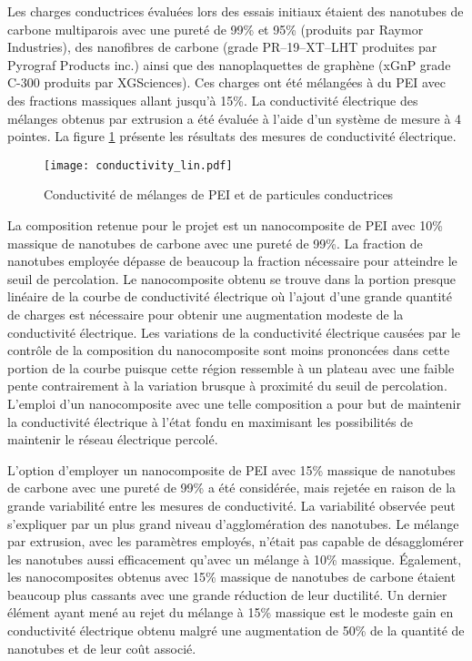 Les charges conductrices évaluées lors des essais initiaux étaient des nanotubes de carbone multiparois avec une pureté de 99\% et 95\% (produits par Raymor Industries), des nanofibres de carbone (grade PR--19--XT--LHT produites par Pyrograf Products inc.) ainsi que des nanoplaquettes de graphène (xGnP grade C-300 produits par XGSciences). 
Ces charges ont été mélangées à du PEI avec des fractions massiques allant jusqu'à 15\%.
La conductivité électrique des mélanges obtenus par extrusion a été évaluée à l'aide d'un système de mesure à 4 pointes. 
La figure \ref{fig:conductivite_lin} présente les résultats des mesures de conductivité électrique. 

\begin{figure}[h]
	\centering
	\texttt{[image: conductivity\_lin.pdf]}
	\caption{Conductivité de mélanges de PEI et de particules conductrices}
	\label{fig:conductivite_lin}
\end{figure}

La composition retenue pour le projet est un nanocomposite de PEI avec 10\% massique de nanotubes de carbone avec une pureté de 99\%. 
La fraction de nanotubes employée dépasse de beaucoup la fraction nécessaire pour atteindre le seuil de percolation.
Le nanocomposite obtenu se trouve dans la portion presque linéaire de la courbe de conductivité électrique où l'ajout d'une grande quantité de charges est nécessaire pour obtenir une augmentation modeste de la conductivité électrique. 
Les variations de la conductivité électrique causées par le contrôle de la composition du nanocomposite sont moins prononcées dans cette portion de la courbe puisque cette région ressemble à un plateau avec une faible pente contrairement à la variation brusque à proximité du seuil de percolation. 
L'emploi d'un nanocomposite avec une telle composition a pour but de maintenir la conductivité électrique à l'état fondu en maximisant les possibilités de maintenir le réseau électrique percolé. 

L'option d'employer un nanocomposite de PEI avec 15\% massique de nanotubes de carbone avec une pureté de 99\% a été considérée, mais rejetée en raison de la grande variabilité entre les mesures de conductivité. 
La variabilité observée peut s'expliquer par un plus grand niveau d'agglomération des nanotubes.  
Le mélange par extrusion, avec les paramètres employés, n'était pas capable de désagglomérer les nanotubes aussi efficacement qu'avec un mélange à 10\% massique. 
Également, les nanocomposites obtenus avec 15\% massique de nanotubes de carbone étaient beaucoup plus cassants avec une grande réduction de leur ductilité. 
Un dernier élément ayant mené au rejet du mélange à 15\% massique est le modeste gain en conductivité électrique obtenu malgré une augmentation de 50\% de la quantité de nanotubes et de leur coût associé. 

